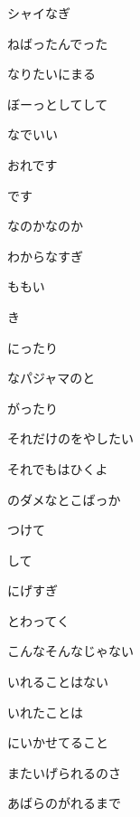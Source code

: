 \documentclass[a4paper,tate,twocolumn,12pt]{ltjtarticle}
\begin{document}
\begin{flushleft}
\begin{minipage}{\linewidth}
シャイなぎ

ねばったんでった

なりたいにまる

ぼーっとしてして

なでいい
\end{minipage}

\vspace{2em}

\noindent\begin{minipage}{\linewidth}
おれです

です

なのかなのか

わからなすぎ

ももい

き

にったり

なパジャマのと

がったり

それだけのをやしたい

それでもはひくよ
\end{minipage}

\vspace{2em}

\noindent\begin{minipage}{\linewidth}
のダメなとこばっか

つけて

して

にげすぎ

とわってく

こんなそんなじゃない

いれることはない

いれたことは

にいかせてること

またいげられるのさ

あばらのがれるまで
\end{minipage}

\end{flushleft}
\end{document}
